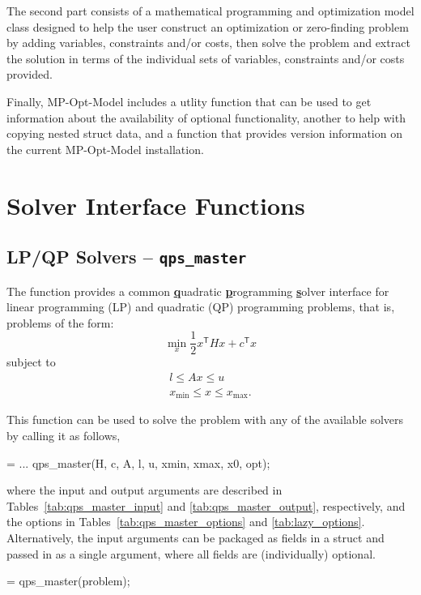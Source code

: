 \documentclass[12pt]{article}
\newcommand{\mpom}[0]{\mbox{MP-Opt-Model}}
\newcommand{\code}[1]{{\relsize{-0.5}{\tt{{#1}}}}}  %
\newcommand{\trans}[1]{{#1}^{\ensuremath{\mathsf{T}}}}  %
\numberwithin{equation}{section}
\numberwithin{table}{section}
\numberwithin{figure}{section}
\begin{document}
The second part consists of a mathematical programming and optimization model class designed to help the user construct an optimization or zero-finding problem by adding variables, constraints and/or costs, then solve the problem and extract the solution in terms of the individual sets of variables, constraints and/or costs provided.

Finally, \mpom{} includes a utlity function that can be used to get information about the availability of optional functionality, another to help with copying nested struct data, and a function that provides version information on the current \mpom{} installation.


\clearpage
\section{Solver Interface Functions}
\label{sec:master_solvers}

\subsection{LP/QP Solvers -- {\tt qps\_master}}
\label{sec:qps_master}

The \code{qps\_master} function provides a common \textbf{\underline{q}}uadratic \textbf{\underline{p}}rogramming \textbf{\underline{s}}olver interface for linear programming (LP) and quadratic (QP) programming problems, that is, problems of the form:
\begin{equation}
\min_x \frac{1}{2} \trans{x} H x + \trans{c} x \label{eq:QPobj}
\end{equation}
subject to
\begin{eqnarray}
& l \le A x \le u  & \\
& x_\mathrm{min} \le x \le x_\mathrm{max}. & \label{eq:QPvarbounds}
\end{eqnarray}

This function can be used to solve the problem with any of the available solvers by calling it as follows,
\begin{Code}
 = ...
    qps_master(H, c, A, l, u, xmin, xmax, x0, opt);
\end{Code}
where the input and output arguments are described in Tables~\ref{tab:qps_master_input} and \ref{tab:qps_master_output}, respectively, and the options in Tables~\ref{tab:qps_master_options} and \ref{tab:lazy_options}.
Alternatively, the input arguments can be packaged as fields in a \code{problem} struct and passed in as a single argument, where all fields are (individually) optional.
\begin{Code}
 = qps_master(problem);
\end{Code}
\end{document}
